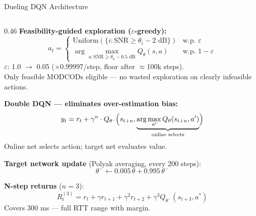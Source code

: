 \documentclass[aspectratio=169,10pt]{beamer}
\begin{document}
\begin{frame}[fragile,shrink=10]{Dueling DQN Architecture}
\begin{columns}[T]
\begin{column}{0.46\textwidth}
      \vspace{0.4em}
      \textbf{Feasibility-guided exploration ($\varepsilon$-greedy):}
      \[a_t=\begin{cases}\text{Uniform}(\{i:\text{SNR}\geq\theta_i-2\text{ dB}\}) & \text{w.p. }\varepsilon\\
        \arg\max_{a:\text{SNR}\geq\theta_a-0.5\text{ dB}}Q_\theta(s,a) & \text{w.p. }1-\varepsilon\end{cases}\]
      $\varepsilon$: 1.0 $\to$ 0.05 ($\times0.99997$/step, floor after $\approx$100k steps).\\
      Only feasible MODCODs eligible — no wasted exploration on clearly infeasible actions.

      \vspace{0.3em}
      \textbf{Double DQN — eliminates over-estimation bias:}
      \[y_t = r_t + \gamma^n\cdot Q_{\theta^-}\!\Bigl(s_{t+n},\underbrace{\arg\max_{a'}Q_\theta(s_{t+n},a')}_{\text{online selects}}\Bigr)\]
      Online net selects action; target net evaluates value.

      \textbf{Target network update} (Polyak averaging, every 200 steps):
      \[\theta^- \leftarrow 0.005\,\theta + 0.995\,\theta^-\]

      \textbf{N-step returns} ($n=3$):
      \[R_t^{(3)} = r_t + \gamma r_{t+1} + \gamma^2 r_{t+2} + \gamma^3 Q_{\theta^-}(s_{t+3},a^*)\]
      Covers 300 ms — full RTT range with margin.
    \end{column}
  \end{columns}
\end{frame}
\end{document}
